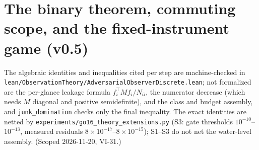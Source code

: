 \documentclass[11pt]{article}
\theoremstyle{definition}
\begin{document}
\section{The binary theorem, commuting scope, and the
fixed-instrument game (v0.5)}\label{sec:v05}

The algebraic identities and inequalities cited per step are
machine-checked in
\texttt{lean/ObservationTheory/AdversarialObserverDiscrete.lean}; not
formalized are the per-glance leakage formula $f_i^\top Mf_i/N_{ii}$,
the numerator decrease (which needs $M$ diagonal and positive
semidefinite), and the class and budget assembly, and
\texttt{junk\_domination} checks only the final inequality. The exact
identities are netted by
\texttt{experiments/go16\_theory\_extensions.py} (S3: gate thresholds
$10^{-10}$--$10^{-13}$, measured residuals $8\times10^{-17}$--$8\times10^{-15}$);
S1--S3 do not net the water-level assembly. (Scoped 2026-11-20, VI-31.)
\end{document}

